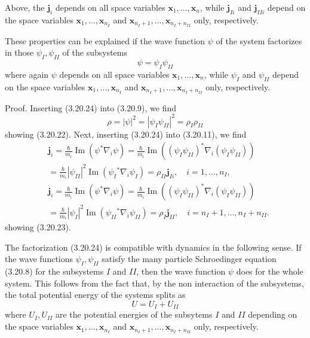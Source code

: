 \documentclass{article}
\begin{document}
Above, the $\boldsymbol{j}_{i}$ depends on all space variables $\boldsymbol{x}_{1}, \ldots, \boldsymbol{x}_{n}$, while $\boldsymbol{j}_{I i}$ and $\boldsymbol{j}_{I I i}$ depend on the space variables $\boldsymbol{x}_{1}, \ldots, \boldsymbol{x}_{n_{I}}$ and $\boldsymbol{x}_{n_{I}+1}, \ldots, \boldsymbol{x}_{n_{I}+n_{I I}}$ only, respectively.

These properties can be explained if the wave function $\psi$ of the system factorizes in those $\psi_{I}, \psi_{I I}$ of the subsystems
$$
\begin{equation*}
\psi=\psi_{I} \psi_{I I} \tag{3.20.24}
\end{equation*}
$$
where again $\psi$ depends on all space variables $\boldsymbol{x}_{1}, \ldots, \boldsymbol{x}_{n}$, while $\psi_{I}$ and $\psi_{I I}$ depend on the space variables $\boldsymbol{x}_{1}, \ldots, \boldsymbol{x}_{n_{I}}$ and $\boldsymbol{x}_{n_{I}+1}, \ldots, \boldsymbol{x}_{n_{I}+n_{I I}}$ only, respectively.

Proof. Inserting (3.20.24) into (3.20.9), we find
$$
\begin{equation*}
\rho=|\psi|^{2}=\left|\psi_{I} \psi_{I I}\right|^{2}=\rho_{I} \rho_{I I} \tag{3.20.25}
\end{equation*}
$$
showing (3.20.22). Next, inserting (3.20.24) into (3.20.11), we find
$$
\begin{align*}
& \boldsymbol{j}_{i}=\frac{\hbar}{m_{i}} \operatorname{Im}\left(\psi^{*} \nabla_{i} \psi\right)=\frac{\hbar}{m_{i}} \operatorname{Im}\left(\left(\psi_{I} \psi_{I I}\right)^{*} \nabla_{i}\left(\psi_{I} \psi_{I I}\right)\right)  \tag{3.20.26}\\
& =\frac{\hbar}{m_{i}}\left|\psi_{I I}\right|^{2} \operatorname{Im}\left(\psi_{I}{ }^{*} \nabla_{i} \psi_{I}\right)=\rho_{I I} \boldsymbol{j}_{I i}, \quad i=1, \ldots, n_{I}, \\
& \boldsymbol{j}_{i}=\frac{\hbar}{m_{i}} \operatorname{Im}\left(\psi^{*} \nabla_{i} \psi\right)=\frac{\hbar}{m_{i}} \operatorname{Im}\left(\left(\psi_{I} \psi_{I I}\right)^{*} \nabla_{i}\left(\psi_{I} \psi_{I I}\right)\right) \\
& =\frac{\hbar}{m_{i}}\left|\psi_{I}\right|^{2} \operatorname{Im}\left(\psi_{I I}{ }^{*} \nabla_{i} \psi_{I I}\right)=\rho_{I} \boldsymbol{j}_{I I}, \quad i=n_{I}+1, \ldots, n_{I}+n_{I I} .
\end{align*}
$$
showing (3.20.23).

The factorization (3.20.24) is compatible with dynamics in the following sense. If the wave functions $\psi_{I}, \psi_{I I}$ satisfy the many particle Schroedinger equation (3.20.8) for the subsystems $I$ and $I I$, then the wave function $\psi$ does for the whole system. This follows from the fact that, by the non interaction of the subsystems,
the total potential energy of the systems splits as
$$
\begin{equation*}
U=U_{I}+U_{I I} \tag{3.20.27}
\end{equation*}
$$
where $U_{I}, U_{I I}$ are the potential energies of the subsytems $I$ and $I I$ depending on the space variables $\boldsymbol{x}_{1}, \ldots, \boldsymbol{x}_{n_{I}}$ and $\boldsymbol{x}_{n_{I}+1}, \ldots, \boldsymbol{x}_{n_{I}+n_{I I}}$ only, respectively.
\end{document}
